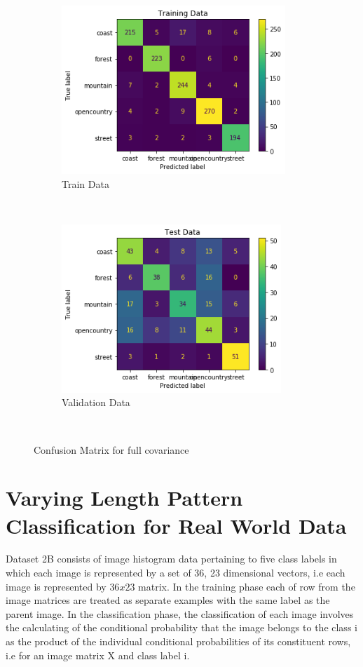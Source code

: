 \newpage
\begin{figure}[!h]
    \centering
    \begin{subfigure}[t]{0.5\textwidth}
        \centering
        \includegraphics[height=2.5in]{Dataset_2a/full covariance train confusion matrix.png} 
        \caption{Train Data}
    \end{subfigure}%
    ~ 
    \begin{subfigure}[t]{0.5\textwidth}
        \centering
        \includegraphics[height=2.5in]{Dataset_2a/full covariance test confusion matrix.png}
        \caption{Validation Data}
    \end{subfigure}%
    ~
    \caption{Confusion Matrix for full covariance}
    \label{fig:29}
\end{figure}

\section{Varying Length Pattern Classification for Real World Data}


Dataset 2B consists of image histogram data pertaining to five class labels in which each image is represented by a set of 36, 23 dimensional vectors, i.e each image is represented by $36x23$ matrix. In the training phase each of row from the image matrices are treated as separate examples with the
same label as the parent image. In the classification phase, the classification of each image involves the calculating of the conditional probability that the image belongs to the class i as the product of the individual conditional probabilities of its constituent rows, i.e for an image matrix X and class label i.

